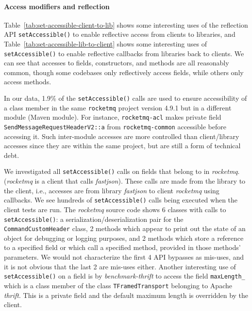 \paragraph{Access modifiers and reflection}


Table~\ref{tab:set-accessible-client-to-lib}
shows some interesting uses of the reflection API \texttt{setAccessible()} to enable reflective access from clients to libraries,
and Table~\ref{tab:set-accessible-lib-to-client} shows  some interesting uses of \texttt{setAccessible()} to enable reflective callbacks from libraries back to clients.
We can see that accesses to fields, constructors, and methods are all reasonably common, though some codebases only reflectively 
access fields, while others only access methods.

In our data, 1.9\% of the \texttt{setAccessible()} calls are 
used to ensure accessibility of a class member
in the same \texttt{rocketmq} project version 4.9.1 but in a different module (Maven module). 
For instance, \texttt{rocketmq-acl} makes private field \texttt{SendMessageRequestHeaderV2::a} from 
\texttt{rocketmq-common} accessible before accessing it. Such inter-module accesses are more controlled than client/library accesses since they are within the same project,
but are still a form of technical debt.

We investigated all \texttt{setAccessible()} calls on fields that belong to in \emph{rocketmq}. (\emph{rocketmq} is a client that calls \emph{fastjson}). These calls are made from the library to the client, i.e., accesses are from library \emph{fastjson} to client \emph{rocketmq} using callbacks. We see hundreds of \texttt{setAccessible()} calls being executed when the client tests are run. The \emph{rocketmq} source code shows 6 classes with calls to \texttt{setAccessible()}: a serialization/deserialization pair for the \texttt{CommandCustomHeader} class, 2 methods which appear to print out the state of an object for debugging or logging purposes, and 2 methods which store a reference to a specified field or which call a specified method, provided in those methods' parameters. We would not characterize the first 4 API bypasses as mis-uses, and it is not obvious that the last 2 are mis-uses either. Another interesting use of \texttt{setAccessible()} on a field is by \emph{benchmark-thrift} to access the field \texttt{maxLength\_}  which is a class member of the class \texttt{TFramedTransport} belonging to Apache \emph{thrift}. This is a private field and the default maximum length is overridden by the client.

